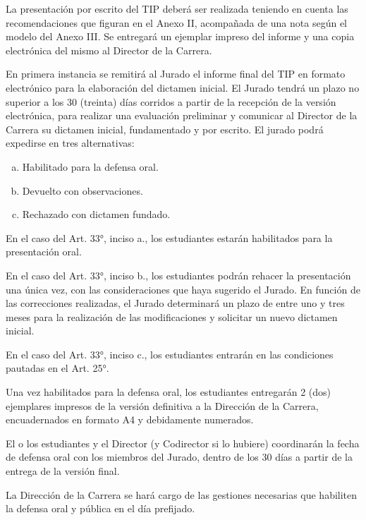 
\articulo La presentación por escrito del TIP deberá ser realizada teniendo
en cuenta las recomendaciones que figuran en el Anexo II, acompañada de una nota
según el modelo del Anexo III. Se entregará un ejemplar impreso del informe y una
copia electrónica del mismo al Director de la Carrera.

\articulo En primera instancia se remitirá al Jurado el informe final del TIP
en formato electrónico para la elaboración del dictamen inicial. El Jurado tendrá un
plazo no superior a los 30 (treinta) días corridos a partir de la recepción de la versión
electrónica, para realizar una evaluación preliminar y comunicar al Director de la
Carrera su dictamen inicial, fundamentado y por escrito. El jurado podrá expedirse en
tres alternativas:

\begin{enumerate}[a.]
\item Habilitado para la defensa oral.
\item Devuelto con observaciones.
\item Rechazado con dictamen fundado.
\end{enumerate}

\articulo En el caso del Art. 33°, inciso a., los estudiantes estarán
habilitados para la presentación oral. 

\articulo En el caso del Art. 33°, inciso b., los estudiantes podrán rehacer
la presentación una única vez, con las consideraciones que haya sugerido el Jurado.
En función de las correcciones realizadas, el Jurado determinará un plazo de entre
uno y tres meses para la realización de las modificaciones y solicitar un nuevo
dictamen inicial.

\articulo En el caso del Art. 33°, inciso c., los estudiantes entrarán en las
condiciones pautadas en el Art. 25°. 


\articulo Una vez habilitados para la defensa oral, los estudiantes
entregarán 2 (dos) ejemplares impresos de la versión definitiva a la Dirección de la
Carrera, encuadernados en formato A4 y debidamente numerados.

\articulo El o los estudiantes y el Director (y Codirector si lo hubiere)
coordinarán la fecha de defensa oral con los miembros del Jurado, dentro de los 30
días a partir de la entrega de la versión final.

\articulo La Dirección de la Carrera se hará cargo de las gestiones
necesarias que habiliten la defensa oral y pública en el día prefijado.

